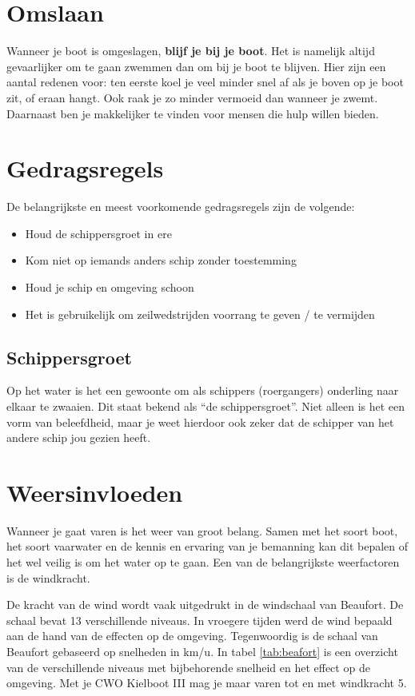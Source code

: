 \section{Omslaan}
Wanneer je boot is omgeslagen, \textbf{blijf je bij je boot}. Het is namelijk altijd gevaarlijker om te gaan zwemmen dan om bij je boot te blijven. Hier zijn een aantal redenen voor: ten eerste koel je veel minder snel af als je boven op je boot zit, of eraan hangt. Ook raak je zo minder vermoeid dan wanneer je zwemt. Daarnaast ben je makkelijker te vinden voor mensen die hulp willen bieden.
\section{Gedragsregels}
De belangrijkste en meest voorkomende gedragsregels zijn de volgende:
\begin{itemize}
    \item Houd de schippersgroet in ere
    \item Kom niet op iemands anders schip zonder toestemming
    \item Houd je schip en omgeving schoon
    \item Het is gebruikelijk om zeilwedstrijden voorrang te geven / te vermijden
\end{itemize}
\subsection*{Schippersgroet}
Op het water is het een gewoonte om als schippers (roergangers) onderling naar elkaar te zwaaien. Dit staat bekend als ``de schippersgroet''. Niet alleen is het een vorm van beleefdheid, maar je weet hierdoor ook zeker dat de schipper van het andere schip jou gezien heeft. 

\section{Weersinvloeden}
Wanneer je gaat varen is het weer van groot belang. Samen met het soort boot, het soort vaarwater en de kennis en ervaring van je bemanning kan dit bepalen of het wel veilig is om het water op te gaan. Een van de belangrijkste weerfactoren is de windkracht.

De kracht van de wind wordt vaak uitgedrukt in de windschaal van Beaufort. De schaal bevat 13 verschillende niveaus. In vroegere tijden werd de wind bepaald aan de hand van de effecten op de omgeving. Tegenwoordig is de schaal van Beaufort gebaseerd op snelheden in km/u. In tabel \ref{tab:beafort} is een overzicht van de verschillende niveaus met bijbehorende snelheid en het effect op de omgeving. Met je CWO Kielboot III mag je maar varen tot en met windkracht 5.


